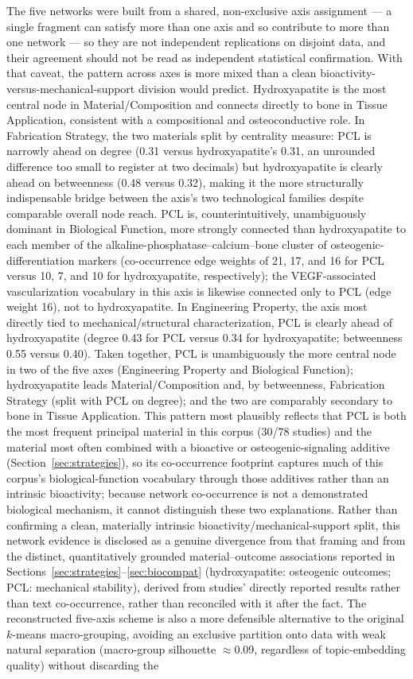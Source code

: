 \documentclass[5p,times,twocolumn]{elsarticle}
\begin{document}
The five networks were built from a shared, non-exclusive axis assignment --- a single fragment can satisfy more than one axis and so contribute to more than one network --- so they are not independent replications on disjoint data, and their agreement should not be read as independent statistical confirmation. With that caveat, the pattern across axes is more mixed than a clean bioactivity-versus-mechanical-support division would predict. Hydroxyapatite is the most central node in Material/Composition and connects directly to bone in Tissue Application, consistent with a compositional and osteoconductive role. In Fabrication Strategy, the two materials split by centrality measure: PCL is narrowly ahead on degree (0.31 versus hydroxyapatite's 0.31, an unrounded difference too small to register at two decimals) but hydroxyapatite is clearly ahead on betweenness (0.48 versus 0.32), making it the more structurally indispensable bridge between the axis's two technological families despite comparable overall node reach. PCL is, counterintuitively, unambiguously dominant in Biological Function, more strongly connected than hydroxyapatite to each member of the alkaline-phosphatase--calcium--bone cluster of osteogenic-differentiation markers (co-occurrence edge weights of 21, 17, and 16 for PCL versus 10, 7, and 10 for hydroxyapatite, respectively); the VEGF-associated vascularization vocabulary in this axis is likewise connected only to PCL (edge weight 16), not to hydroxyapatite. In Engineering Property, the axis most directly tied to mechanical/structural characterization, PCL is clearly ahead of hydroxyapatite (degree 0.43 for PCL versus 0.34 for hydroxyapatite; betweenness 0.55 versus 0.40). Taken together, PCL is unambiguously the more central node in two of the five axes (Engineering Property and Biological Function); hydroxyapatite leads Material/Composition and, by betweenness, Fabrication Strategy (split with PCL on degree); and the two are comparably secondary to bone in Tissue Application. This pattern most plausibly reflects that PCL is both the most frequent principal material in this corpus (30/78 studies) and the material most often combined with a bioactive or osteogenic-signaling additive (Section~\ref{sec:strategies}), so its co-occurrence footprint captures much of this corpus's biological-function vocabulary through those additives rather than an intrinsic bioactivity; because network co-occurrence is not a demonstrated biological mechanism, it cannot distinguish these two explanations. Rather than confirming a clean, materially intrinsic bioactivity/mechanical-support split, this network evidence is disclosed as a genuine divergence from that framing and from the distinct, quantitatively grounded material--outcome associations reported in Sections~\ref{sec:strategies}--\ref{sec:biocompat} (hydroxyapatite: osteogenic outcomes; PCL: mechanical stability), derived from studies' directly reported results rather than text co-occurrence, rather than reconciled with it after the fact. The reconstructed five-axis scheme is also a more defensible alternative to the original $k$-means macro-grouping, avoiding an exclusive partition onto data with weak natural separation (macro-group silhouette $\approx$0.09, regardless of topic-embedding quality) without discarding the 
\end{document}
